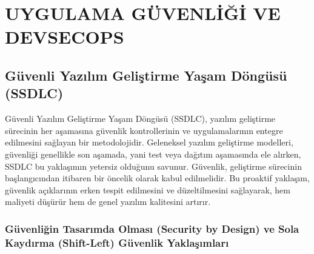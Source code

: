 \chapter{UYGULAMA GÜVENLİĞİ VE DEVSECOPS}

\section{Güvenli Yazılım Geliştirme Yaşam Döngüsü (SSDLC)}

Güvenli Yazılım Geliştirme Yaşam Döngüsü (SSDLC), yazılım geliştirme sürecinin her aşamasına güvenlik kontrollerinin ve uygulamalarının entegre edilmesini sağlayan bir metodolojidir. Geleneksel yazılım geliştirme modelleri, güvenliği genellikle son aşamada, yani test veya dağıtım aşamasında ele alırken, SSDLC bu yaklaşımın yetersiz olduğunu savunur. Güvenlik, geliştirme sürecinin başlangıcından itibaren bir öncelik olarak kabul edilmelidir. Bu proaktif yaklaşım, güvenlik açıklarının erken tespit edilmesini ve düzeltilmesini sağlayarak, hem maliyeti düşürür hem de genel yazılım kalitesini artırır.

\subsection{Güvenliğin Tasarımda Olması (Security by Design) ve Sola Kaydırma (Shift-Left) Güvenlik Yaklaşımları}

